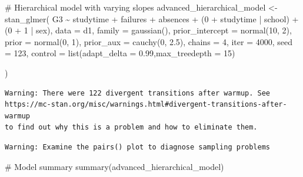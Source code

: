 \documentclass[
  10pt,
]{article}
\newenvironment{Shaded}{\begin{snugshade}}{\end{snugshade}}
\newcommand{\AttributeTok}[1]{\textcolor[rgb]{0.40,0.45,0.13}{#1}}
\newcommand{\CommentTok}[1]{\textcolor[rgb]{0.37,0.37,0.37}{#1}}
\newcommand{\DecValTok}[1]{\textcolor[rgb]{0.68,0.00,0.00}{#1}}
\newcommand{\FloatTok}[1]{\textcolor[rgb]{0.68,0.00,0.00}{#1}}
\newcommand{\FunctionTok}[1]{\textcolor[rgb]{0.28,0.35,0.67}{#1}}
\newcommand{\NormalTok}[1]{\textcolor[rgb]{0.00,0.23,0.31}{#1}}
\newcommand{\OtherTok}[1]{\textcolor[rgb]{0.00,0.23,0.31}{#1}}
\newcommand{\SpecialCharTok}[1]{\textcolor[rgb]{0.37,0.37,0.37}{#1}}
\begin{document}
\begin{Shaded}
\begin{Highlighting}[]
\CommentTok{\# Hierarchical model with varying slopes}
\NormalTok{advanced\_hierarchical\_model }\OtherTok{\textless{}{-}} \FunctionTok{stan\_glmer}\NormalTok{(}
\NormalTok{  G3 }\SpecialCharTok{\textasciitilde{}}\NormalTok{ studytime }\SpecialCharTok{+}\NormalTok{ failures }\SpecialCharTok{+}\NormalTok{ absences }\SpecialCharTok{+}\NormalTok{ (}\DecValTok{0} \SpecialCharTok{+}\NormalTok{ studytime }\SpecialCharTok{|}\NormalTok{ school) }\SpecialCharTok{+}\NormalTok{ (}\DecValTok{0} \SpecialCharTok{+} \DecValTok{1} \SpecialCharTok{|}\NormalTok{ sex),}
  \AttributeTok{data =}\NormalTok{ d1,}
  \AttributeTok{family =} \FunctionTok{gaussian}\NormalTok{(),}
  \AttributeTok{prior\_intercept =} \FunctionTok{normal}\NormalTok{(}\DecValTok{10}\NormalTok{, }\DecValTok{2}\NormalTok{),}
  \AttributeTok{prior =} \FunctionTok{normal}\NormalTok{(}\DecValTok{0}\NormalTok{, }\DecValTok{1}\NormalTok{),}
  \AttributeTok{prior\_aux =} \FunctionTok{cauchy}\NormalTok{(}\DecValTok{0}\NormalTok{, }\FloatTok{2.5}\NormalTok{),}
  \AttributeTok{chains =} \DecValTok{4}\NormalTok{,}
  \AttributeTok{iter =} \DecValTok{4000}\NormalTok{,}
  \AttributeTok{seed =} \DecValTok{123}\NormalTok{,}
  \AttributeTok{control =} \FunctionTok{list}\NormalTok{(}\AttributeTok{adapt\_delta =} \FloatTok{0.99}\NormalTok{,}\AttributeTok{max\_treedepth =} \DecValTok{15}\NormalTok{)}

\NormalTok{)}
\end{Highlighting}
\end{Shaded}

\begin{verbatim}
Warning: There were 122 divergent transitions after warmup. See
https://mc-stan.org/misc/warnings.html#divergent-transitions-after-warmup
to find out why this is a problem and how to eliminate them.
\end{verbatim}

\begin{verbatim}
Warning: Examine the pairs() plot to diagnose sampling problems
\end{verbatim}

\begin{Shaded}
\begin{Highlighting}[]
\CommentTok{\# Model summary}
\FunctionTok{summary}\NormalTok{(advanced\_hierarchical\_model)}
\end{Highlighting}
\end{Shaded}
\end{document}
